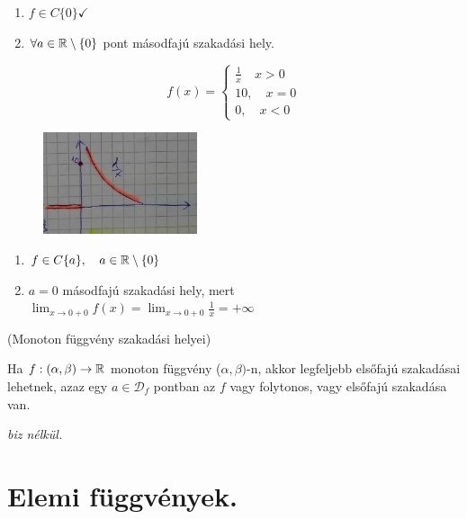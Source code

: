 \documentclass[a4paper,11.5pt]{article}
\begin{document}
\begin{revision}
\begin{note}
\begin{example}
\begin{figure}[H]
					\caption{}\label{}
				\end{figure}
				\begin{enumerate}
					\item $f\in C\{0\}\checkmark$
					\item $\forall a\in\mathbb{R}\setminus\{0\}$ pont másodfajú szakadási hely.
				\end{enumerate}
			\end{example}
			\begin{example}
				\[ f(x)=\left\{\begin{gathered}
				\frac{1}{x}\quad x>0\\
				10,\quad x=0\\
				0,\quad x<0
				\end{gathered}\right. \]
				\begin{figure}[H]
					\centering
					\includegraphics[height=3cm]{kepek/03ea_5.jpg}
					\caption{}\label{}
				\end{figure}
				\begin{enumerate}
					\item $f\in C\{a\}, \quad a\in \mathbb{R}\setminus\{0\}$
					\item $a=0$ másodfajú szakadási hely, mert $\lim_{x\to0+0}f(x)=\lim_{x\to0+0}\frac{1}{x}=+\infty$
				\end{enumerate}
			\end{example}
		\end{note}
	\end{revision}
	\begin{theorem}
		(Monoton függvény szakadási helyei)
		
		Ha $f:(\alpha,\beta)\to\mathbb{R}$ monoton függvény ($\alpha,\beta)$-n, akkor legfeljebb elsőfajú szakadásai lehetnek, azaz egy $a\in\mathcal{D}_f$ pontban az $f$ vagy folytonos, vagy elsőfajú szakadása van.
		
		\medskip
		\textit{biz nélkül.} 
	\end{theorem}
	\section{Elemi függvények.}
\end{document}
